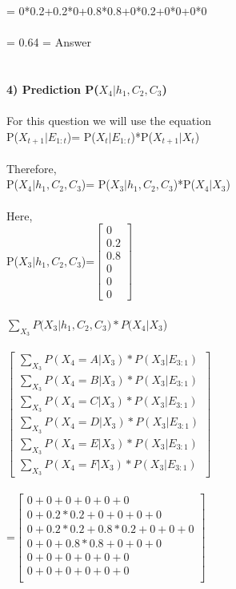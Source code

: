 \documentclass[11pt,a4paper]{article}
\begin{document}
= 0*0.2+0.2*0+0.8*0.8+0*0.2+0*0+0*0\\\\
= 0.64 = Answer\\\\\\
\newpage
\textbf{4) Prediction P($X_{4}| h_{1}, C_{2}, C_{3}$)\\\\}
For this question we will use the equation\\
P($X_{t+1}| E_{1:t}$)= P($X_{t}|E_{1:t}$)*P($X_{t+1}|X_{t}$)\\
\\
Therefore, \\
P($X_{4}|h_{1}, C_{2}, C_{3}$)= P($X_{3}|h_{1}, C_{2}, C_{3}$)*P($X_{4}|X_{3}$)\\\\
Here, \\
P($X_{3}|h_{1}, C_{2}, C_{3}$)=$\begin{bmatrix}
0 \\ 
0.2\\ 
0.8\\ 
0\\
0\\
0
\end{bmatrix}$
\\\\
$\sum_{X_{3}}P(X_{3}|h_{1}, C_{2}, C_{3})*P(X_{4}|X_{3}$)\\\\
$\begin{bmatrix}
\sum_{X_{3}}P(X_{4}=A|X_{3})*P(X_{3}|E_{3:1}) \\ 
\sum_{X_{3}}P(X_{4}=B|X_{3})*P(X_{3}|E_{3:1}) \\ 
\sum_{X_{3}}P(X_{4}=C|X_{3})*P(X_{3}|E_{3:1}) \\ 
\sum_{X_{3}}P(X_{4}=D|X_{3})*P(X_{3}|E_{3:1}) \\
\sum_{X_{3}}P(X_{4}=E|X_{3})*P(X_{3}|E_{3:1}) \\
\sum_{X_{3}}P(X_{4}=F|X_{3})*P(X_{3}|E_{3:1}) 
\end{bmatrix}$
\\\\
=$\begin{bmatrix}
0+0+0+0+0+0\\
0+0.2*0.2+0+0+0+0\\
0+0.2*0.2+0.8*0.2+0+0+0\\
0+0+0.8*0.8+0+0+0\\
0+0+0+0+0+0\\
0+0+0+0+0+0\\
\end{bmatrix}$
\end{document}
